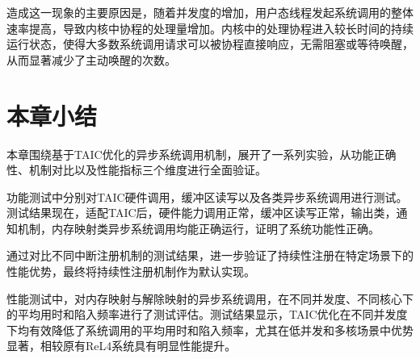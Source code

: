 造成这一现象的主要原因是，随着并发度的增加，用户态线程发起系统调用的整体速率提高，导致内核中协程的处理量增加。内核中的处理协程进入较长时间的持续运行状态，使得大多数系统调用请求可以被协程直接响应，无需阻塞或等待唤醒，从而显著减少了主动唤醒的次数。

\section{本章小结}

本章围绕基于TAIC优化的异步系统调用机制，展开了一系列实验，从功能正确性、机制对比以及性能指标三个维度进行全面验证。

功能测试中分别对TAIC硬件调用，缓冲区读写以及各类异步系统调用进行测试。测试结果现在，适配TAIC后，硬件能力调用正常，缓冲区读写正常，输出类，通知机制，内存映射类异步系统调用均能正确运行，证明了系统功能性正确。

通过对比不同中断注册机制的测试结果，进一步验证了持续性注册在特定场景下的性能优势，最终将持续性注册机制作为默认实现。

性能测试中，对内存映射与解除映射的异步系统调用，在不同并发度、不同核心下的平均用时和陷入频率进行了测试评估。测试结果显示，TAIC优化在不同并发度下均有效降低了系统调用的平均用时和陷入频率，尤其在低并发和多核场景中优势显著，相较原有ReL4系统具有明显性能提升。\cite{lzb1,lzb2,lzb3,lzb4,lzb5,lzb6,lzb7,lzb8}
